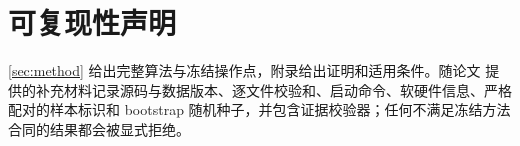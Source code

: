 \documentclass{article}
\newcommand{\1}{\mathbf{1}}
\begin{document}
\section*{可复现性声明}
\cref{sec:method} 给出完整算法与冻结操作点，附录给出证明和适用条件。随论文
提供的补充材料记录源码与数据版本、逐文件校验和、启动命令、软硬件信息、严格
配对的样本标识和 bootstrap 随机种子，并包含证据校验器；任何不满足冻结方法
合同的结果都会被显式拒绝。

\renewcommand{\refname}{参考文献}



\clearpage
\appendix

\end{document}
